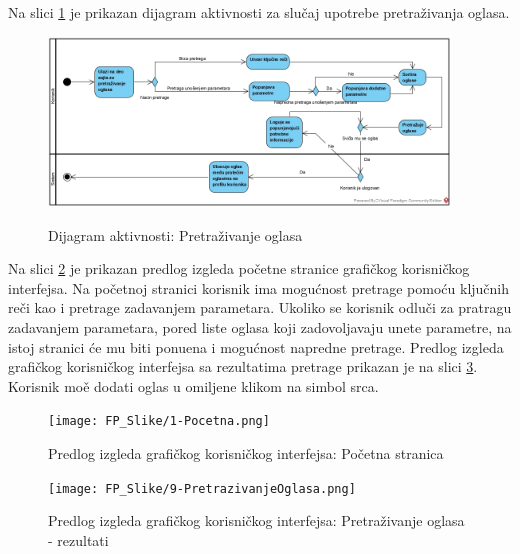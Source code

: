 \documentclass[20pt]{article}
\begin{document}
\setlength{\parindent}{1cm}
\fontsize{13}{18} \selectfont 

Na slici \ref{fig:dijagramAktivnostiPretrazivanjeOglasa} je prikazan dijagram aktivnosti za slu\v{c}aj upotrebe pretra\v {z}ivanja oglasa.

\begin{figure}[h]
        \centering
        \includegraphics[width=0.95\textwidth,height=0.49\textheight]{Pictures/PretrazivanjeOglasa}\\
        \caption{Dijagram aktivnosti: Pretra\v {z}ivanje oglasa}
        \label{fig:dijagramAktivnostiPretrazivanjeOglasa}
    \end{figure}

\newpage
{}
\setlength{\parindent}{1cm}
\fontsize{13}{18} \selectfont 
Na slici \ref{fig:guiPretrazivanjeOglasa} je prikazan predlog izgleda po\v cetne stranice grafi\v ckog korisni\v ckog interfejsa. Na po\v cetnoj stranici korisnik ima mogu\' cnost pretrage pomo\' cu klju\v cnih re\v ci kao i pretrage zadavanjem parametara. Ukoliko se korisnik odlu\v ci za pratragu zadavanjem parametara, pored liste oglasa koji zadovoljavaju unete parametre, na istoj stranici \' ce mu biti ponu\dj ena i mogu\' cnost napredne pretrage. Predlog izgleda grafi\v ckog korisni\v ckog interfejsa sa rezultatima pretrage prikazan je na slici \ref{fig:guiPretrazivanjeOglasaRez}. Korisnik mo\v e dodati oglas u omiljene klikom na simbol srca.

\begin{figure}[h]
        \centering
        \texttt{[image: FP\_Slike/1-Pocetna.png]}\\
        \caption{Predlog izgleda grafi\v ckog korisni\v ckog interfejsa: Po\v cetna stranica}
        \label{fig:guiPretrazivanjeOglasa}
    \end{figure}

\newpage
\begin{figure}[h]
        \centering
        \texttt{[image: FP\_Slike/9-PretrazivanjeOglasa.png]}\\
        \caption{Predlog izgleda grafi\v ckog korisni\v ckog interfejsa: Pretra\v zivanje oglasa - rezultati}
        \label{fig:guiPretrazivanjeOglasaRez}
    \end{figure}
\end{document}
